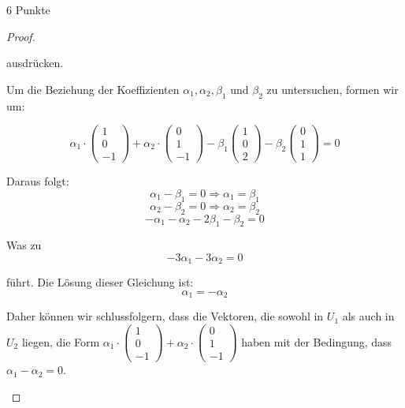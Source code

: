\documentclass{../problemset}
\begin{document}
\begin{problem}{6 Punkte}
\begin{proof}
\begin{enumerate}
		      ausdrücken.

		      Um die Beziehung der Koeffizienten \(\alpha_1, \alpha_2, \beta_1\) und \(\beta_2\) zu untersuchen, formen wir um:

		      \[
			      \alpha_1 \cdot \begin{pmatrix}
				      1 \\
				      0 \\
				      -1
			      \end{pmatrix} + \alpha_2 \cdot \begin{pmatrix}
				      0 \\
				      1 \\
				      -1
			      \end{pmatrix} - \beta_1 \begin{pmatrix}
				      1 \\ 0 \\ 2
			      \end{pmatrix} - \beta_2 \begin{pmatrix}
				      0 \\ 1 \\ 1
			      \end{pmatrix} = 0
		      \]

		      Daraus folgt:
		      \[
			      \alpha_1 - \beta_1 = 0 \Rightarrow \alpha_1 = \beta_1
		      \]
		      \[
			      \alpha_2 - \beta_2 = 0 \Rightarrow \alpha_2 = \beta_2
		      \]
		      \[
			      -\alpha_1 - \alpha_2 - 2\beta_1 - \beta_2 = 0
		      \]

		      Was zu
		      \[
			      -3\alpha_1 -3\alpha_2 = 0
		      \]

		      führt. Die Lösung dieser Gleichung ist:
		      \[
			      \alpha_1 = -\alpha_2
		      \]

		      Daher können wir schlussfolgern, dass die Vektoren, die sowohl in \(U_1\) als auch in \(U_2\) liegen, die Form \(\alpha_1 \cdot \begin{pmatrix}
			      1 \\
			      0 \\
			      -1
		      \end{pmatrix} + \alpha_2 \cdot \begin{pmatrix}
			      0 \\
			      1 \\
			      -1
		      \end{pmatrix}\) haben mit der Bedingung, dass \(\alpha_1 - \alpha_2 = 0\).
	\end{enumerate}
\end{proof}
\end{problem}
\end{document}

